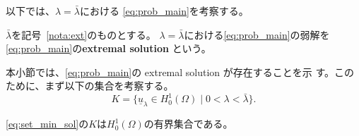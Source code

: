 以下では、$\lambda = \bar{\lambda}$における
\ref{eq:prob_main}を考察する。

\begin{defn}
 $\bar{\lambda}$を記号~\ref{nota:ext}のものとする。
 $\lambda = \bar{\lambda}$における\ref{eq:prob_main}の弱解を
 \ref{eq:prob_main}の{\bf extremal solution }という。
\end{defn}

本小節では、\ref{eq:prob_main}の extremal solution が存在することを示
す。このために、まず以下の集合を考察する。
\begin{equation}
 K = \{ \underline{u}_\lambda \in H_0^1(\Omega) \mid 0 < \lambda <
  \bar{\lambda} \}.
  \label{eq:set_min_sol}
\end{equation}

\begin{lem} \label{lem:set_min_sol}
 \eqref{eq:set_min_sol}の$K$は$H_0^1(\Omega)$の有界集合である。
\end{lem}

